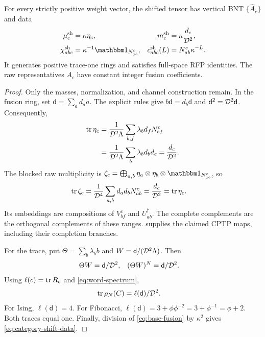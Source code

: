 \begin{proposition}
	\label{prop:category-shift}
	For every strictly positive weight vector, the shifted tensor has
	vertical BNT $\{\widehat A_c\}$ and data
	\begin{align}
		\mu_c^{\mathrm{sh}} & =\kappa\eta_c,              &
		m_c^{\mathrm{sh}}   & =\kappa\frac{d_c}{\mc D^2},   \\
		\chi_{abc}^{\mathrm{sh}}
		                    & =\kappa^{-1}\Id_{N_{ab}^c}, &
		c_{abc}^{\mathrm{sh}}(L)
		                    & =N_{ab}^c\kappa^{-L}.
		\label{eq:category-shift-data}
	\end{align}
	It generates positive trace-one rings and satisfies full-space RFP
	identities. The raw representatives $A_c$ have constant integer
	fusion coefficients.
\end{proposition}

\begin{proof}
	Only the masses, normalization, and channel construction remain.
	In the fusion ring, set $\mathsf d=\sum_ad_aa$. The explicit rules give
	$b\mathsf d=d_b\mathsf d$ and $\mathsf d^2=\mathcal{D}^2\mathsf d$.
	Consequently,
	\begin{align}
		\operatorname{tr}\eta_c
		 & =\frac1{\mathcal{D}^2\Lambda}
		\sum_{b,f}\lambda_bd_fN_{bf}^c \\
		 & =\frac1{\mathcal{D}^2\Lambda}
		\sum_b\lambda_bd_bd_c
		=\frac{d_c}{\mathcal{D}^2}.
		\label{eq:category-mass}
	\end{align}
	The blocked raw multiplicity is
	$\zeta_c=\bigoplus_{a,b}\eta_a\otimes\eta_b
		\otimes\Id_{N_{ab}^c}$, so
	\begin{align}
		\operatorname{tr}\zeta_c
		 & =\frac1{\mathcal{D}^4}\sum_{a,b}d_ad_bN_{ab}^c
		=\frac{d_c}{\mathcal{D}^2}
		=\operatorname{tr}\eta_c.
	\end{align}
	Its embeddings are compositions of $V_{bf}^c$ and
	$U_{ab}^\dagger$. The complete complements are the orthogonal
	complements of these ranges.  supplies the
	claimed CPTP maps, including their completion branches.

	For the trace, put $\Theta=\sum_b\lambda_bb$ and
	$W=\mathsf d/(\mathcal{D}^2\Lambda)$. Then
	\begin{align}
		\Theta W     & =\mathsf d/\mathcal{D}^2, &
		(\Theta W)^N & =\mathsf d/\mathcal{D}^2.
	\end{align}
	Using $\ell(c)=\operatorname{tr} R_c$ and \cref{eq:word-spectrum},
	\begin{align}
		\operatorname{tr}\rho_N(C) & =\ell(\mathsf d)/\mathcal{D}^2.
	\end{align}
	For Ising, $\ell(\mathsf d)=4$. For Fibonacci,
	$\ell(\mathsf d)=3+\phi\phi^{-2}=3+\phi^{-1}=\phi+2$.
	Both traces equal one. Finally, division of
	\cref{eq:base-fusion} by $\kappa^2$ gives
	\cref{eq:category-shift-data}.
\end{proof}

